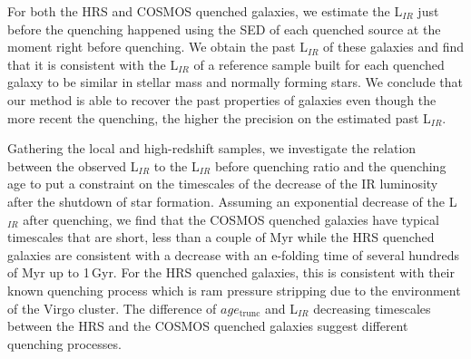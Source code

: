 \documentclass[traditabstract]{aa} %
\begin{document}
For both the HRS and COSMOS quenched galaxies, we estimate the L$_{IR}$ just before the quenching happened using the SED of each quenched source at the moment right before quenching.
We obtain the past L$_{IR}$ of these galaxies and find that it is consistent with the L$_{IR}$ of a reference sample built for each quenched galaxy to be similar in stellar mass and normally forming stars.
We conclude that our method is able to recover the past properties of galaxies even though the more recent the quenching, the higher the precision on the estimated past L$_{IR}$.

Gathering the local and high-redshift samples, we investigate the relation between the observed L$_{IR}$ to the L$_{IR}$ before quenching ratio and the quenching age to put a constraint on the timescales of the decrease of the IR luminosity after the shutdown of star formation.
Assuming an exponential decrease of the L$_{IR}$ after quenching, we find that the COSMOS quenched galaxies have typical timescales that are short, less than a couple of Myr while the HRS quenched galaxies are consistent with a decrease with an e-folding time of several hundreds of Myr up to 1\,Gyr.
For the HRS quenched galaxies, this is consistent with their known quenching process which is ram pressure stripping due to the environment of the Virgo cluster.
The difference of $age_{\mathrm{trunc}}$ and L$_{IR}$ decreasing timescales between the HRS and the COSMOS quenched galaxies suggest different quenching processes.
\end{document}
